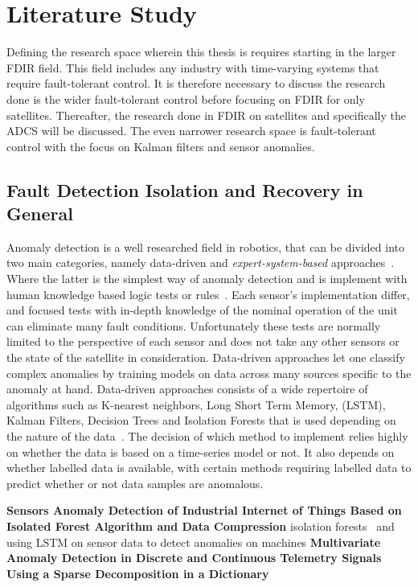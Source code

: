 \chapter{Literature Study}
\label{chap:Literature Study}

Defining the research space wherein this thesis is requires starting in the larger FDIR field. This field includes any industry with time-varying systems that require fault-tolerant control. It is therefore necessary to discuss the research done is the wider fault-tolerant control before focusing on FDIR for only satellites. Thereafter, the research done in FDIR on satellites and specifically the ADCS will be discussed. The even narrower research space is fault-tolerant control with the focus on Kalman filters and sensor anomalies.

\section{Fault Detection Isolation and Recovery in General}
Anomaly detection is a well researched field in robotics, that can be divided into two main categories, namely data-driven and \emph{expert-system-based} approaches~\cite{Gao2015}. Where the latter is the simplest way of anomaly detection and is implement with human knowledge based logic tests or rules~\cite{Systems1993, sobhani2009fault}.  Each sensor's implementation differ, and focused tests with in-depth knowledge of the nominal operation of the unit can eliminate many fault conditions.  Unfortunately these tests are normally limited to the perspective of each sensor and does not take any other sensors or the state of the satellite in consideration. Data-driven approaches let one classify complex anomalies by training models on data across many sources specific to the anomaly at hand. Data-driven approaches consists of a wide repertoire of algorithms such as K-nearest neighbors, Long Short Term Memory, (LSTM), Kalman Filters, Decision Trees and Isolation Forests that is used depending on the nature of the data~\cite{Liu2021, Ciftciogl1991, Malhotra2016}. The decision of which method to implement relies highly on whether the data is based on a time-series model or not. It also depends on whether labelled data is available, with certain methods requiring labelled data to predict whether or not data samples are anomalous. 

\textbf{Sensors Anomaly Detection of Industrial Internet of Things Based on Isolated Forest Algorithm and Data Compression}
isolation forests~\cite{Liu2021} and using LSTM on sensor data to detect anomalies on machines 
\textbf{Multivariate Anomaly Detection in Discrete and Continuous Telemetry Signals Using a Sparse Decomposition in a Dictionary}
\cite{Pilastre2020}

